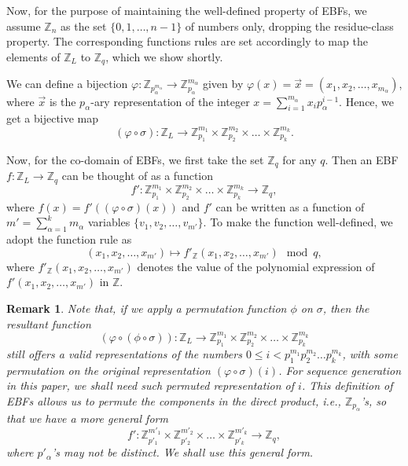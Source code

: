 \documentclass[pdflatex,sn-mathphys-num]{sn-jnl}%
\theoremstyle{thmstyleone}
\newtheorem{remark}{Remark}
\begin{document}
	Now, for the purpose of maintaining the well-defined property of EBFs, we assume $\mathbb{Z}_n$ as the set $\{0,1, \dots, n-1\}$ of numbers only, dropping the residue-class property. The corresponding functions rules are set accordingly to map the elements of $\mathbb{Z}_L$ to $\mathbb{Z}_q$, which we show shortly.
	
	We can define a bijection $\varphi: \mathbb{Z}_{p_\alpha^{m_\alpha}} \rightarrow \mathbb{Z}_{p_\alpha}^{m_\alpha}$ given by $\varphi (x)= \vec{x}= (x_1, x_2, \dots, x_{m_\alpha})$, where $\vec{x}$ is the $p_\alpha$-ary representation of the integer $x= \sum_{i=1}^{m_\alpha} x_i p_\alpha^{i-1}$. Hence, we get a bijective map
	\begin{equation}\label{eqn_CRT_comb}
		\left( \varphi \circ \sigma \right): \mathbb{Z}_L \rightarrow \mathbb{Z}_{p_1}^{m_1} \times \mathbb{Z}_{p_2}^{m_2} \times \dots \times \mathbb{Z}_{p_k}^{m_k}.
	\end{equation}
	
	Now, for the co-domain of EBFs, we first take the set $\mathbb{Z}_q$ for any $q$. Then an EBF $f: \mathbb{Z}_L \rightarrow \mathbb{Z}_q$ can be thought of as a function
	\begin{equation}
		f': \mathbb{Z}_{p_1}^{m_1} \times \mathbb{Z}_{p_2}^{m_2} \times \dots \times \mathbb{Z}_{p_k}^{m_k} \rightarrow \mathbb{Z}_q,
	\end{equation}
	where $f(x)= f' \left((\varphi \circ \sigma)(x) \right)$ and $f'$ can be written as a function of $m'=\sum_{\alpha=1}^{k}m_\alpha$ variables $\{v_1, v_2, \dots, v_{m'}\}$. To make the function well-defined, we adopt the function rule as
	\begin{equation}
		\left(x_1, x_2, \dots, x_{m'}\right) \mapsto f'_{\mathbb{Z}} (x_1, x_2, \dots, x_{m'}) \mod q,
	\end{equation}
	where $f'_{\mathbb{Z}} (x_1, x_2, \dots, x_{m'})$ denotes the value of the polynomial expression of $f'(x_1, x_2, \dots, x_{m'})$ in $\mathbb{Z}$.
	
	\begin{remark}
		Note that, if we apply a permutation function $\phi$ on $\sigma$, then the resultant function
		\begin{equation}
			\left( \varphi \circ (\phi \circ \sigma) \right) : \mathbb{Z}_L \rightarrow \mathbb{Z}_{p_1}^{m_1} \times \mathbb{Z}_{p_2}^{m_2} \times \dots \times \mathbb{Z}_{p_k}^{m_k}
		\end{equation}
		still offers a valid representations of the numbers $0 \leq i < p_1^{m_1} p_2^{m_2} \dots p_k^{m_k}$, with some permutation on the original representation $\left( \varphi \circ \sigma \right) (i)$. For sequence generation in this paper, we shall need such permuted representation of $i$.
		This definition of EBFs allows us to permute the components in the direct product, i.e., $\mathbb{Z}_{p_\alpha}$'s, so that we have a more general form
		\begin{equation}\label{eq_ebf2}
			f' : \mathbb{Z}_{p'_1}^{m'_1} \times \mathbb{Z}_{p'_2}^{m'_2} \times \dots \times \mathbb{Z}_{p'_k}^{m'_k} \rightarrow \mathbb{Z}_q,
		\end{equation}
		where $p'_\alpha$'s may not be distinct. We shall use this general form.
	\end{remark}
	
\end{document}
